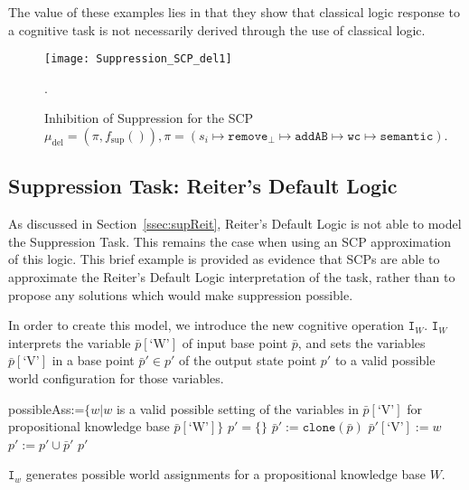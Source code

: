 The value of these examples lies in that they show that classical logic response to a cognitive task is not necessarily derived through the use of classical logic.

\begin{figure}
\centering \texttt{[image: Suppression\_SCP\_del1]}
\caption{Inhibition of Suppression for the SCP $\mu_\text{del}=(\pi,f_\text{sup}()), \pi = (s_i \longmapsto \texttt{remove}_\bot \longmapsto \texttt{addAB} \longmapsto \texttt{wc} \longmapsto \texttt{semantic}).$}.
\label{fig:Suppression_SCP_del1}
\end{figure}




\subsection{Suppression Task: Reiter's Default Logic}

As discussed in Section~\ref{ssec:supReit}, Reiter's Default Logic is not able to model the Suppression Task. This remains the case when using an SCP approximation of this logic. This brief example is provided as evidence that SCPs are able to approximate the Reiter's Default Logic interpretation of the task, rather than to propose any solutions which would make suppression possible.

In order to create this model, we introduce the new cognitive operation $\texttt{I}_W$. $\texttt{I}_W$ interprets the variable $\bar{p}[\text{`W'}]$ of input base point $\bar{p}$, and sets the variables  $\bar{p}[\text{`V'}]$ in a base point $\bar{p}'\in p'$ of the output state point $p'$ to a valid possible world configuration for those variables.


\begin{algorithm}[H]
\SetAlgoLined
{}
{
possibleAss:=$\{w|w$ is a valid possible setting of the variables in $ \bar{p}[\text{`V'}] $ for propositional knowledge base $\bar{p}[\text{`W'}]\}$\;
$p'=\{\}$\;
{
$\bar{p}':=\texttt{clone}(\bar{p})$\;
$\bar{p}'[\text{`V'}]:=w$\;
$p':=p' \cup \bar{p}'$\;
} 
\Return $p'$
}
\caption{$\texttt{I}_w$ generates possible world assignments for a propositional knowledge base $W$.}
 \label{alg:I}
\end{algorithm}

